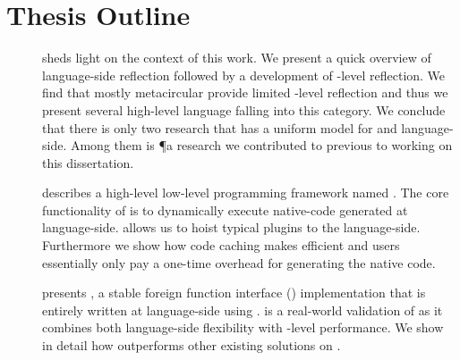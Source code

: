 \section{Thesis Outline}

\begin{description}
\item[] sheds light on the context of this work.
	We present a quick overview of language-side reflection followed by a development of \VM-level reflection.
	We find that mostly metacircular \VMs provide limited \VM-level reflection and thus we present several high-level language \VMs falling into this category.
	We conclude that there is only two research \VM that has a uniform model for \VM and language-side.
	Among them is \P a research \ST \VM we contributed to previous to working on this dissertation.


\item[] describes a high-level low-level programming framework named \B.
	The core functionality of \B is to dynamically execute native-code generated at language-side.
	\B allows us to hoist typical \VM plugins to the language-side.
	Furthermore we show how code caching makes \B efficient and users essentially only pay a one-time overhead for generating the native code.
	
\item[] presents \NB, a stable foreign function interface (\FFI) implementation that is entirely written at language-side using \B.
	\NB is a real-world validation of \B as it combines both language-side flexibility with \VM-level performance.
	We show in detail how \NB outperforms other existing \FFI solutions on \PH.


\end{description}
